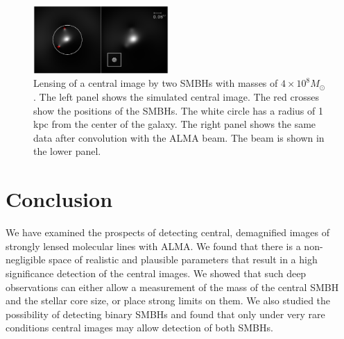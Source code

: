 \documentclass[chicago]{emulateapj}
\newcommand{\red}{\textcolor{red}}
\begin{document}
\begin{figure}
\begin{center}
\centering
\includegraphics[trim= 20 0 20 0, width=0.46\textwidth]{figures/f_05.eps}
\centering
\end{center}
\caption{ Lensing of a central image by two SMBHs with masses of $4\times 10^8M_{\odot}$. The left panel shows the simulated central image. The red crosses show the positions of the SMBHs. The white circle has a radius of 1 kpc  from the center of the galaxy. The right panel shows the same data after convolution with the ALMA beam. The beam is shown in the lower panel.
\label{fig:5}}
\end{figure}



\section{Conclusion}
We have examined the prospects of detecting central, demagnified images of strongly lensed molecular lines with ALMA. We found that there is a non-negligible space of realistic and plausible parameters that result in a high significance detection of the central images. We showed that such deep observations can either allow a measurement of the mass of the central SMBH and the stellar core size, or place strong limits on them.
We also studied the possibility of detecting binary SMBHs and found that only under very rare conditions central images may allow detection of both SMBHs. 



\acknowledgements{
\red{Acknowledge NSF?}}




%
\end{document}
